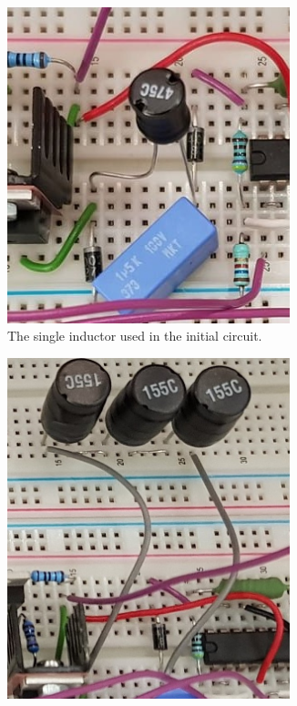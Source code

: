 \documentclass[../report.tex]{subfiles}
\begin{document}
\begin{figure}[H]
    \centering
    \begin{subfigure}[t]{0.49\textwidth}
        \centering
        \includegraphics[width=0.9\textwidth]{figures/circuit/single_inductor.jpg}
        \captionsetup{width=0.9\textwidth}
        \caption{The single inductor used in the initial circuit.}  
        \label{fig:inductors:single}
    \end{subfigure}
    \begin{subfigure}[t]{0.49\textwidth}  
        \centering 
        \includegraphics[width=0.9\textwidth]{figures/circuit/triple_inductor.jpg}

\end{subfigure}
\end{figure}
\end{document}
